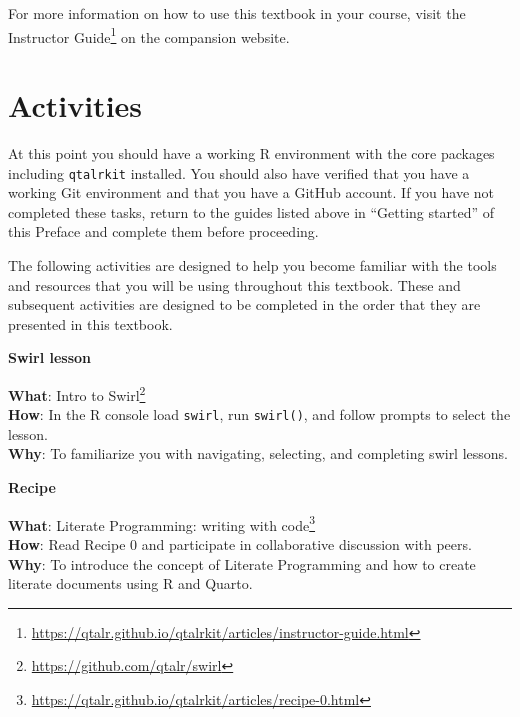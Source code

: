 \documentclass[
  letterpaper,
  DIV=11,
  numbers=noendperiod]{scrreport}
\theoremstyle{definition}
\theoremstyle{remark}
\DeclareRobustCommand{\href}[2]{#2\footnote{\url{#1}}}
\begin{document}
For more information on how to use this textbook in your course, visit
the
\href{https://qtalr.github.io/qtalrkit/articles/instructor-guide.html}{Instructor
Guide} on the compansion website.

\hypertarget{sec-p-activities}{%
\section*{Activities}\label{sec-p-activities}}


At this point you should have a working R environment with the core
packages including \texttt{qtalrkit} installed. You should also have
verified that you have a working Git environment and that you have a
GitHub account. If you have not completed these tasks, return to the
guides listed above in ``Getting started'' of this Preface and complete
them before proceeding.

The following activities are designed to help you become familiar with
the tools and resources that you will be using throughout this textbook.
These and subsequent activities are designed to be completed in the
order that they are presented in this textbook.

\begin{tcolorbox}[enhanced jigsaw, opacityback=0, bottomrule=.15mm, left=2mm, breakable, colback=white, leftrule=.75mm, toprule=.15mm, rightrule=.15mm, arc=.35mm]

\textbf{ Swirl lesson}

\textbf{What}: \href{https://github.com/qtalr/swirl}{Intro to Swirl}\\
\textbf{How}: In the R console load \texttt{swirl}, run
\texttt{swirl()}, and follow prompts to select the lesson.\\
\textbf{Why}: To familiarize you with navigating, selecting, and
completing swirl lessons.

\end{tcolorbox}

\begin{tcolorbox}[enhanced jigsaw, opacityback=0, bottomrule=.15mm, left=2mm, breakable, colback=white, leftrule=.75mm, toprule=.15mm, rightrule=.15mm, arc=.35mm]

\textbf{ Recipe}

\textbf{What}:
\href{https://qtalr.github.io/qtalrkit/articles/recipe-0.html}{Literate
Programming: writing with code}\\
\textbf{How}: Read Recipe 0 and participate in collaborative discussion
with peers.\\
\textbf{Why}: To introduce the concept of Literate Programming and how
to create literate documents using R and Quarto.

\end{tcolorbox}
\end{document}
